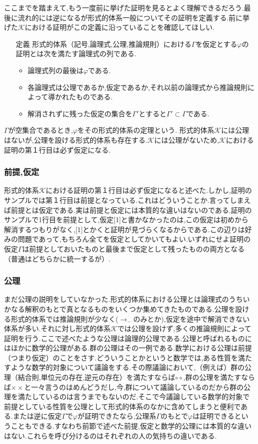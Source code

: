 \documentclass[10pt,b5paper,papersize,dvipdfmx]{jsbook}
\begin{document}
ここまでを踏まえて,もう一度前に挙げた証明を見るとよく理解できるだろう.最後に流れ的には逆になるが形式的体系一般についてその証明を定義する.前に挙げた$\mathcal K$における証明がこの定義に沿っていることを確認してほしい.
\begin{itemize}
\item[定義] 形式的体系（記号,論理式,公理,推論規則）における$\Gamma$を仮定とする$\varphi$の証明とは次を満たす論理式の列である.
\begin{itemize}
\item 論理式列の最後は$\varphi$である.
\item 各論理式は公理であるか,仮定であるか,それ以前の論理式から推論規則によって導かれたものである.
\item 解消されずに残った仮定の集合を$\Gamma'$とすると$\Gamma'\subset \Gamma$である.
\end{itemize}
\end{itemize}
$\Gamma$が空集合であるとき,$\varphi$をその形式的体系の定理という.
形式的体系$\mathcal K$には公理はないが,公理を設ける形式的体系も存在する.$\mathcal K$には公理がないため,$\mathcal K$における証明の第１行目は必ず仮定になる.

\subsubsection{前提,仮定}
形式的体系$\mathcal K$における証明の第１行目は必ず仮定になると述べた.しかし,証明のサンプルでは第１行目は前提となっている.これはどういうことか.言ってしまえば前提とは仮定である.実は前提と仮定には本質的な違いはないのである.証明のサンプルで1行目を前提として,仮定[1]と書かなかったのは,この仮定は初めから解消するつもりがなく,[1]とかくと証明が見づらくなるからである.この辺りは好みの問題であって,もちろん全てを仮定としてかいてもよい.いずれにせよ証明の仮定$\Gamma$は前提としておいたものと最後まで仮定として残ったものの両方となる（普通はどちらかに統一するが）.

\subsubsection{公理}
まだ公理の説明をしていなかった.形式的体系における公理とは論理式のうちいかなる解釈のもとで真となるものをいくつか集めてきたものである.公理を設ける形式的体系では推論規則が少なく($\to_-$のみとか),仮定を途中で解消できない体系が多い.それに対し形式的体系$\mathcal K$では公理を設けず,多くの推論規則によって証明を行う.ここで述べたような公理は論理的公理である.公理と呼ばれるものにはほかに数学的公理がある.群の公理はその一例である.数学における公理は前提（つまり仮定）のことをさす.どういうことかというと数学では,ある性質を満たすような数学的対象について議論をする.その際議論において,（例えば）群の公理（結合則,単位元の存在,逆元の存在）を満たすならば$\circ \circ$,群の公理を満たすならば$\times \times$と一々言うのはめんどうだし,今,群について議論しているのだから群の公理を満たしているのは言うまでもないのだ.そこで今議論している数学的対象で前提としている性質を公理として形式的体系のなかに含めてしまうと便利である.または逆に仮定$\Gamma$で$\varphi$が証明できたなら,公理系$\Gamma$のもとで$\varphi$は証明できるということもできる.すなわち前節で述べた前提,仮定と数学的公理には本質的な違いはない.これらを呼び分けるのはそれぞれの人の気持ちの違いである.
\end{document}
